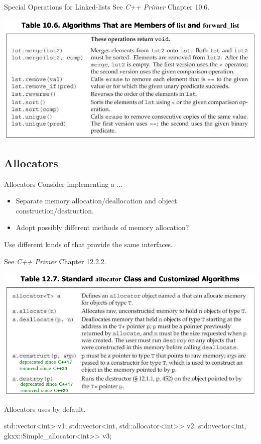\begin{frame}[fragile]{Special Operations for Linked-lists}
    See \textit{C++ Primer} Chapter 10.6.
    \begin{center}
        \includegraphics[width=\textwidth]{figures/list_operations.png}
    \end{center}
\end{frame}

\subsection{Allocators}

\begin{frame}{Allocators}
    Consider implementing a ...
    \begin{itemize}
        \item Separate memory allocation/deallocation and object construction/destruction.
        \item Adopt possibly different methods of memory allocation?
    \end{itemize}
    \pause
    Use different kinds of  that provide the same interfaces.
\end{frame}

\begin{frame}[fragile]{}
    See \textit{C++ Primer} Chapter 12.2.2.
    \begin{center}
        \includegraphics[width=\textwidth]{figures/allocator_operations.png}
    \end{center}
\end{frame}

\begin{frame}[fragile]{Allocators}
     uses  by default.
    \begin{cpp}
std::vector<int> v1;
std::vector<int, std::allocator<int>> v2;
std::vector<int, gkxx::Simple_allocator<int>> v3;
    \end{cpp}
\end{frame}